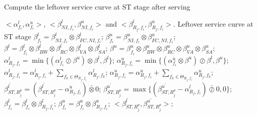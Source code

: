 \documentclass[preprint]{elsarticle}
\begin{document}
\begin{algorithm}
\caption{Compute the leftover service curve at ST stage after serving}
\label{alg:leftoverscl}
\begin{algorithmic}[1]
\Require $<\alpha_{f_i}^l,\alpha^u_{f_i}>$, $<\beta_{NI,f_i}^l,\beta_{NI,f_i}^u>$ and $<\beta_{R_j,f_i}^l,\beta_{R_j,f_i}^u>$.
\Ensure Leftover service curve at ST stage
\State $\beta_{f_i}^l=\beta_{NI,f_i}^l\otimes\beta_{FC,NI,f_i}^l$; $\beta_{f_i}^u=\beta_{NI,f_i}^u\otimes\beta_{FC,NI,f_i}^u$;
        \State $\beta^l=\beta^l_{f_i}\otimes\beta_{BW}^l\otimes\beta_{RC}^l\otimes\beta_{VA}^l\otimes\beta_{SA}^l$;
        \State $\beta^u=\beta^u_{f_i}\otimes\beta_{BW}^u\otimes\beta_{RC}^u\otimes\beta_{VA}^u\otimes\beta_{SA}^u$;
        \State $\alpha^l_{R_j,f_i}=\min\{(\alpha^l_{f_i}\oslash\beta^u)\otimes\beta^l,\beta^l\}$;
        \State $\alpha^u_{R_j,f_i}=\min\{(\alpha^u_{f_i}\otimes\beta^u)\oslash\beta^l,\beta^u\}$;
            \State $\alpha^l_{R_j,f_i}=\alpha^l_{R_j,f_i}+\sum_{f_k\in\Theta_{R_j,f_i}}\alpha^l_{R_j,f_k}$;
            \State $\alpha^u_{R_j,f_i}=\alpha^u_{R_j,f_i}+\sum_{f_k\in\Theta_{R_j,f_i}}\alpha^u_{R_j,f_k}$;
            \State $\beta^{l^\prime}_{ST,R_j^{p}}=(\beta^{l^\prime}_{ST,R_j^{p}}-\alpha^u_{R_j,f_i})\bar{\otimes}0$;
            \State $\beta^{u^\prime}_{ST,R_j^{p}}=\max\{(\beta^{u^\prime}_{ST,R_j^{p}}-\alpha^l_{R_j,f_i})\bar{\oslash}0,0\}$;
        \EndIf
    \EndIf
    \State $\beta_{f_i}^l=\beta_{f_i}^l\otimes\beta^l_{R_j,f_i}$; $\beta_{f_i}^u=\beta_{f_i}^u\otimes\beta^u_{R_j,f_i}$;
    \State \Return $<\beta^{l^\prime}_{ST,R_j^{p}},\beta^{u^\prime}_{ST,R_j^{p}}>$;
\EndFor
\EndFunction
\end{algorithmic}
\end{algorithm}
\end{document}
